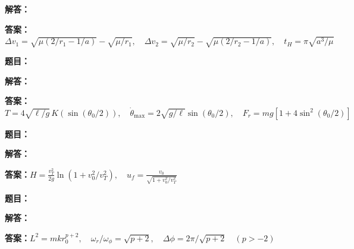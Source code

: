 \documentclass[lang=cn,color=blue,11pt]{elegantbook}
\begin{document}
\par\noindent\textbf{解答：}
\par\noindent\textbf{答案：}\(\displaystyle \Delta v_1=\sqrt{\mu(2/r_1-1/a)}-\sqrt{\mu/r_1},\quad \Delta v_2=\sqrt{\mu/r_2}-\sqrt{\mu(2/r_2-1/a)},\quad t_H=\pi\sqrt{a^3/\mu}\)\par
\par\smallskip\noindent\hrulefill\par\medskip
{}\par
\noindent\textbf{题目：}
\par\noindent\textbf{解答：}
\par\noindent\textbf{答案：}\(\displaystyle T=4\sqrt{\ell/g}\,K(\sin(\theta_0/2)),\quad \dot\theta_{\max}=2\sqrt{g/\ell}\sin(\theta_0/2),\quad F_r=mg[1+4\sin^2(\theta_0/2)]\)\par
\par\smallskip\noindent\hrulefill\par\medskip
{}\par
\noindent\textbf{题目：}
\par\noindent\textbf{解答：}
\par\noindent\textbf{答案：}\(\displaystyle H=\frac{v_T^2}{2g}\ln(1+v_0^2/v_T^2),\quad u_f=\frac{v_0}{\sqrt{1+v_0^2/v_T^2}}\)\par
\par\smallskip\noindent\hrulefill\par\medskip
{}\par
\noindent\textbf{题目：}
\par\noindent\textbf{解答：}
\par\noindent\textbf{答案：}\(\displaystyle L^2=mk r_0^{p+2},\quad \omega_r/\omega_\phi=\sqrt{p+2},\quad\Delta\phi=2\pi/\sqrt{p+2}\quad(p>-2)\)\par
\par\smallskip\noindent\hrulefill\par\medskip
{}\par
\end{document}
